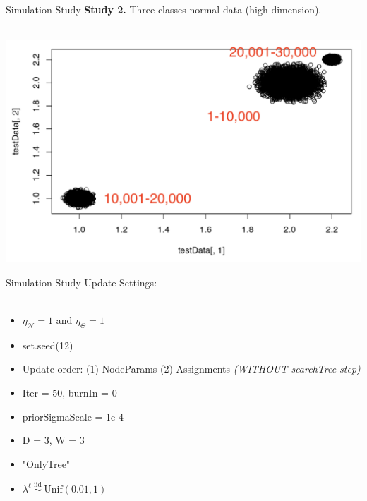 \documentclass[10 pt]{beamer}
\begin{document}
\begin{frame}{Simulation Study}
	\textbf{Study 2.} Three classes normal data (high dimension).\\
	~\\
	\centerline{\includegraphics[scale=0.4]{figs/simulationData2.png}}
\end{frame}


\begin{frame}{Simulation Study}
	Update Settings:\\
	~\\
	\begin{itemize}
		\item $\eta_{\mathcal{N}}=1$ and $\eta_{\Theta}=1$
		\item set.seed(12)
		\item Update order: (1) NodeParams (2) Assignments \textit{(WITHOUT searchTree step)}
		\item Iter = 50, burnIn = 0
		\item priorSigmaScale = 1e-4
		\item D = 3, W = 3
		\item "OnlyTree"
		\item $\lambda^\ell  \stackrel{\text { iid }}{\sim} \text{Unif}(0.01, 1)$
	\end{itemize}
\end{frame}
\end{document}
